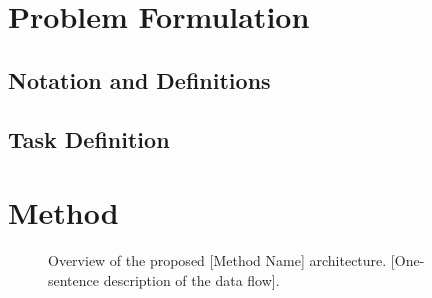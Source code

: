 \documentclass[journal,onecolumn,draftcls]{IEEEtran}
\begin{document}
\section{Problem Formulation}
\label{sec:problem}


\subsection{Notation and Definitions}
\label{sec:problem-notation}


\subsection{Task Definition}
\label{sec:problem-task}


\section{Method}
\label{sec:method}


\begin{figure}[t]
  \centering
  \caption{Overview of the proposed [Method Name] architecture.
           [One-sentence description of the data flow].}
  \label{fig:architecture}
\end{figure}
\end{document}
